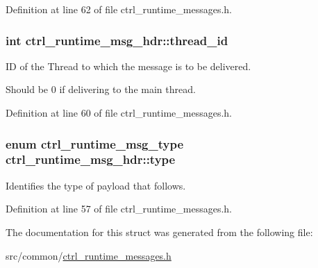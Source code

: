 Definition at line 62 of file ctrl\-\_\-runtime\-\_\-messages.\-h.

\hypertarget{structctrl__runtime__msg__hdr_a43dc841753e857ee2a825e3c253644df}{
\subsubsection[{thread\-\_\-id}]{\setlength{\rightskip}{0pt plus 5cm}int ctrl\-\_\-runtime\-\_\-msg\-\_\-hdr\-::thread\-\_\-id}}\label{structctrl__runtime__msg__hdr_a43dc841753e857ee2a825e3c253644df}


I\-D of the Thread to which the message is to be delivered. 

Should be 0 if delivering to the main thread. 

Definition at line 60 of file ctrl\-\_\-runtime\-\_\-messages.\-h.

\hypertarget{structctrl__runtime__msg__hdr_a765e6683d264c80a950d44f9e6936fcf}{
\subsubsection[{type}]{\setlength{\rightskip}{0pt plus 5cm}enum {\bf ctrl\-\_\-runtime\-\_\-msg\-\_\-type} ctrl\-\_\-runtime\-\_\-msg\-\_\-hdr\-::type}}\label{structctrl__runtime__msg__hdr_a765e6683d264c80a950d44f9e6936fcf}


Identifies the type of payload that follows. 



Definition at line 57 of file ctrl\-\_\-runtime\-\_\-messages.\-h.



The documentation for this struct was generated from the following file\-:\begin{DoxyCompactItemize}
\item 
src/common/\hyperlink{ctrl__runtime__messages_8h}{ctrl\-\_\-runtime\-\_\-messages.\-h}\end{DoxyCompactItemize}
